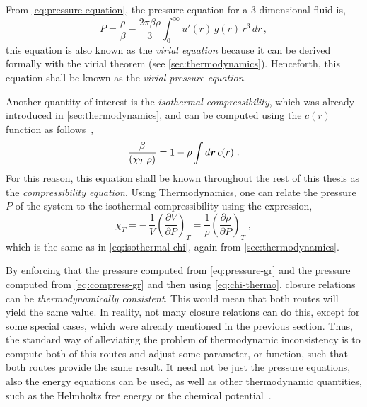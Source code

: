 From \autoref{eq:pressure-equation}, the pressure equation for a $3$-dimensional fluid is,
\begin{equation}
    P = \frac{\rho}{\beta} - \frac{2 \pi \beta \rho}{3} \int_{0}^{\infty} u'(r) \, g(r) \, r^3 \, dr \, ,
    \label{eq:pressure-gr}
\end{equation}
this equation is also known as the \emph{virial equation} because it can be derived 
formally with the virial theorem (see \autoref{sec:thermodynamics}). Henceforth, 
this equation shall be known as the \emph{virial pressure equation}.

Another quantity of interest is the \emph{isothermal compressibility}, which was already 
introduced in \autoref{sec:thermodynamics}, and can be computed using the \(c(r)\) function 
as follows~\cite{hansenTheorySimpleLiquids2013},
\begin{equation}
    \frac{\beta}{\left( \chi_{T} \,  \rho \right)} = 1 - \rho \int d \bm{r} \, c(r)
    \; .
    \label{eq:compress-gr}
\end{equation}
For this reason, this equation shall be known throughout the rest of this thesis as the 
\emph{compressibility equation}. Using Thermodynamics, one can relate the pressure \(P\) of the system to the isothermal compressibility using the expression,
\begin{equation}
    \chi_{T} = - \, \frac{1}{V} { \left( \frac{\partial V}{\partial P} \right) }_{T} =
    \frac{1}{\rho} { \left( \frac{\partial \rho}{\partial P} \right) }_{T}
    \; ,
    \label{eq:chi-thermo}
\end{equation}
which is the same as in \autoref{eq:isothermal-chi}, again from 
\autoref{sec:thermodynamics}.

By enforcing that the pressure computed from \autoref{eq:pressure-gr} and the pressure 
computed from \autoref{eq:compress-gr} and then using \autoref{eq:chi-thermo}, closure 
relations can be \emph{thermodynamically consistent}. This would mean that both routes will 
yield the same value. In reality, not many closure relations can do this, except for some 
special cases, which were already mentioned in the previous section. Thus, the standard way 
of alleviating the problem of thermodynamic inconsistency is to compute both of this routes 
and adjust some parameter, or function, such that both routes provide the same result. It 
need not be just the pressure equations, also the energy equations can be used, as well as 
other thermodynamic quantities, such as the Helmholtz free energy or the chemical 
potential~\cite{tsedneeClosureOrnsteinZernikeEquation2019}.

